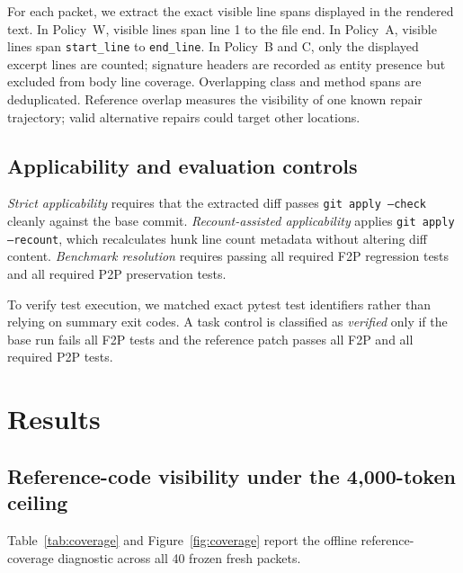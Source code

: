 \documentclass[11pt]{article}
\begin{document}
For each packet, we extract the exact visible line spans displayed in
the rendered text.  In Policy~W, visible lines span line 1 to the file end.
In Policy~A, visible lines span \texttt{start\_line} to \texttt{end\_line}.
In Policy~B and C, only the displayed excerpt lines are counted; signature
headers are recorded as entity presence but excluded from body line coverage.
Overlapping class and method spans are deduplicated.  Reference overlap
measures the visibility of one known repair trajectory; valid alternative
repairs could target other locations.

\subsection{Applicability and evaluation controls}

\emph{Strict applicability} requires that the extracted diff passes
\texttt{git apply --check} cleanly against the base commit.
\emph{Recount-assisted applicability} applies \texttt{git apply --recount},
which recalculates hunk line count metadata without altering diff content.
\emph{Benchmark resolution} requires passing all required F2P regression
tests and all required P2P preservation tests.

To verify test execution, we matched exact pytest test identifiers rather
than relying on summary exit codes.  A task control is classified as
\emph{verified} only if the base run fails all F2P tests and the reference
patch passes all F2P and all required P2P tests.

\section{Results}

\subsection{Reference-code visibility under the 4,000-token ceiling}

Table~\ref{tab:coverage} and Figure~\ref{fig:coverage} report the offline
reference-coverage diagnostic across all 40 frozen fresh packets.

\begin{table}[tb]
\centering
\caption{Reference-code visibility across 40 frozen packets (10 tasks $\times$ 4 policies).  File overlap: packets with the reference file present.  Files visible: total reference files displayed.  Entity overlap: packets displaying the reference entity (for Policy~W, counted when the whole file encloses the target entity).  Edit lines visible: reference-modified base lines displayed (numerator, denominator, pooled percentage, and per-task mean percentage).}
\label{tab:coverage}
\small
\end{table}
\end{document}
